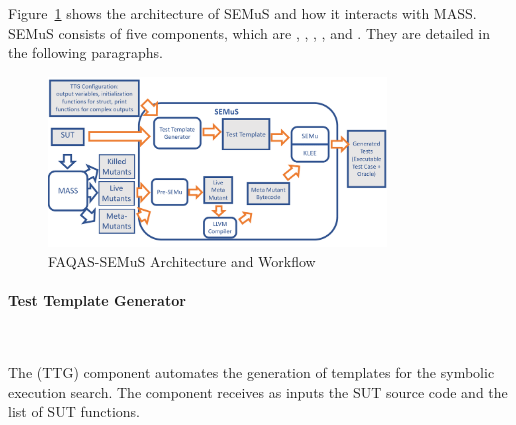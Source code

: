 




Figure~\ref{fig:semus_architecture} shows the architecture of SEMuS and how it interacts with MASS. SEMuS consists of five components, which are ,  ,  ,  , and .
They are detailed in the following paragraphs.

\begin{figure}[h]
\begin{center}
\includegraphics[width=0.8\textwidth]{images/semus-architecture2}
\caption{FAQAS-SEMuS Architecture and Workflow}
\label{fig:semus_architecture}
\end{center}
\end{figure}


\paragraph{Test Template Generator}\

The  (TTG) component automates the generation of templates for the symbolic execution search. The component receives as inputs the SUT source code and the list of SUT functions.

